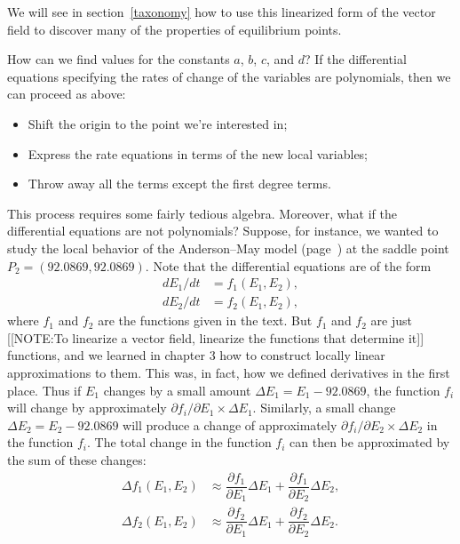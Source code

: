 We will see in section~\ref{taxonomy} how to use this linearized form of the vector field to discover many of the properties of equilibrium points.

How can we find values for the constants $a$, $b$, $c$, and $d$?  If
the differential equations specifying the rates of change of the
variables are polynomials, then we can proceed as above:
\begin{itemize}

\item Shift the origin to the point we're interested in;

\item Express the rate equations in terms of the new local variables;

\item Throw away all the terms except the first degree terms.

\end{itemize}

This process requires some fairly tedious algebra.  Moreover, what if
the differential equations are not polynomials?  Suppose, for
instance, we wanted to study the local behavior of the Anderson--May
model (page~\pageref{`amprob'}) at the saddle point $P_2=(92.0869,
92.0869)$. Note that the differential equations are of the form
\begin{align*}
dE_1/dt &= f_1(E_1,E_2), \\
dE_2/dt &= f_2(E_1,E_2),
\end{align*}
where $f_1$ and $f_2$ are the functions given in the text. But $f_1$
and $f_2$ are just
[[NOTE:To linearize a vector field, linearize the functions that determine it]]
functions, and we learned in chapter 3 how to construct locally linear
approximations to them.  This was, in fact, how we defined derivatives
in the first place.  Thus if $E_1$ changes by a small amount $\Delta
E_1=E_1-92.0869$, the function $f_i$ will change by approximately
$\partial f_i/\partial E_1 \times \Delta E_1$.  Similarly, a small
change $\Delta E_2=E_2-92.0869$ will produce a change of approximately
$\partial f_i/\partial E_2 \times \Delta E_2$ in the function $f_i$.
The total change in the function $f_i$ can then be approximated by the
sum of these changes:
\begin{align*}
\Delta f_1(E_1,E_2) &\approx 
       \dfrac{\partial f_1}{\partial E_1}\Delta E_1 
       + \dfrac{\partial f_1}{\partial E_2}\Delta E_2, \\
\Delta f_2(E_1,E_2) &\approx 
       \dfrac{\partial f_2}{\partial E_1}\Delta E_1 
       + \dfrac{\partial f_2}{\partial E_2}\Delta E_2.
\end{align*}

